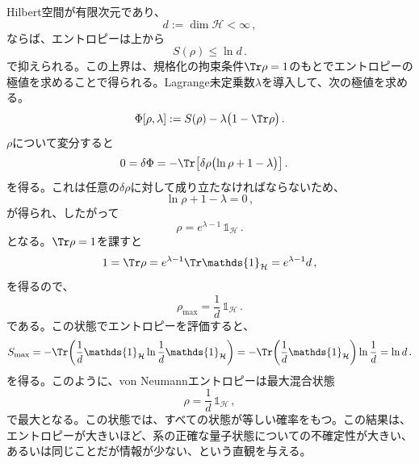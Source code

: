 \documentclass[a4paper,11pt,oneside]{article}
\theoremstyle{definition}
\numberwithin{equation}{section}
\begin{document}
Hilbert空間が有限次元であり、
\begin{equation}
d := \dim \mathcal H < \infty \,,
\end{equation}
ならば、エントロピーは上から
\begin{equation}
S(\rho) \le \ln d \,.
\end{equation}
で抑えられる。この上界は、規格化の拘束条件$\Tr \rho =1$のもとでエントロピーの極値を求めることで得られる。Lagrange未定乗数$\lambda$を導入して、次の極値を求める。
\begin{equation}
\Phi[\rho,\lambda] := S(\rho) - \lambda \bigl(1-\Tr \rho \bigr) \,.
\end{equation}
$\rho$について変分すると
\begin{align}
0 = \delta \Phi
&= - \Tr\!\left[\delta \rho \bigl(\ln \rho + 1 - \lambda \bigr)\right] .
\end{align}
を得る。これは任意の$\delta \rho$に対して成り立たなければならないため、
\begin{equation}
\ln \rho + 1 - \lambda = 0 \,,
\end{equation}
が得られ、したがって
\begin{equation}
\rho = e^{\lambda-1}\,\mathds{1} _{\mathcal H} \,.
\end{equation}
となる。$\Tr \rho =1$を課すと
\begin{equation}
1 = \Tr \rho = e^{\lambda-1}\Tr \mathds{1} _{\mathcal H} = e^{\lambda-1} d \,,
\end{equation}
を得るので、
\begin{equation}
\rho_{\max} = \frac{1}{d}\,\mathds{1} _{\mathcal H} \,.
\end{equation}
である。この状態でエントロピーを評価すると、
\begin{equation}
S_{\max}
=
-\Tr\!\left(\frac{1}{d}\mathds{1} _{\mathcal H}\ln \frac{1}{d}\mathds{1} _{\mathcal H}\right)
=
-\Tr\!\left(\frac{1}{d}\mathds{1} _{\mathcal H}\right)\ln \frac{1}{d}
=
\ln d \,.
\end{equation}
を得る。このように、von Neumannエントロピーは最大混合状態
\begin{equation}
\rho = \frac{1}{d}\,\mathds{1} _{\mathcal H} \,,
\end{equation}
で最大となる。この状態では、すべての状態が等しい確率をもつ。この結果は、エントロピーが大きいほど、系の正確な量子状態についての不確定性が大きい、あるいは同じことだが情報が少ない、という直観を与える。
\end{document}
